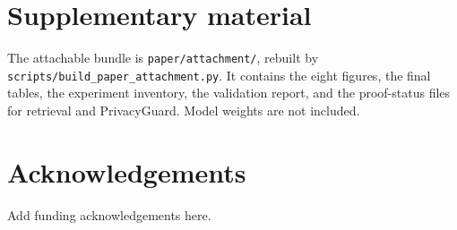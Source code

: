 \documentclass[review,12pt]{elsarticle}
\begin{document}
\section*{Supplementary material}
The attachable bundle is \texttt{paper/attachment/}, rebuilt by
\texttt{scripts/build\_paper\_attachment.py}.
It contains the eight figures, the final tables, the experiment inventory,
the validation report, and the proof-status files for retrieval and PrivacyGuard.
Model weights are not included.

\section*{Acknowledgements}
Add funding acknowledgements here.



\end{document}
